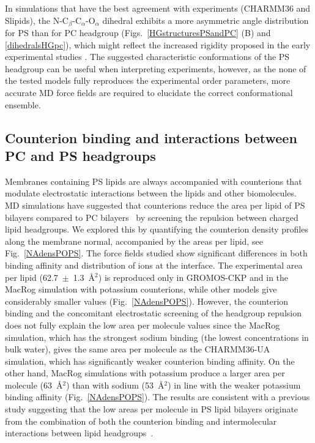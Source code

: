 \documentclass[journal=jpcbfk,manuscript=article]{achemso}
\begin{document}
In simulations that have the best agreement with experiments (CHARMM36 and Slipids),
the N-C$_\beta$-C$_\alpha$-O$_\alpha$ dihedral exhibits a more asymmetric
angle distribution for PS than for PC headgroup (Figs.~\ref{HGstructuresPSandPC} (B) and \ref{dihedralsHGpc}),
which might reflect the increased rigidity proposed in the early experimental studies \cite{browning80,buldt81}.
The suggested characteristic conformations of the PS headgroup can be useful when interpreting experiments,
however, as the none of the tested models fully reproduces the experimental order parameters, more accurate MD force fields are required to elucidate the correct conformational ensemble.

\subsection{Counterion binding and interactions between PC and PS headgroups}\label{ciBINDINGsection}

Membranes containing PS lipids are always accompanied with counterions that
modulate electrostatic interactions between the lipids and other biomolecules. MD simulations have suggested
that counterions reduce the area per lipid of PS bilayers compared to PC
bilayers~\cite{pandit02,mukhopadhyay04,pedersen06} by screening the repulsion between charged lipid headgroups.
We explored this by quantifying the counterion density profiles along the membrane normal, accompanied by the areas per lipid, see Fig.~\ref{NAdensPOPS}.
The force fields studied show significant differences in both binding affinity
and distribution of ions at the interface.
The experimental area per lipid (62.7~$\pm$~1.3~\AA$^2$) \cite{pan14} 
is reproduced only in GROMOS-CKP and in the MacRog simulation
with potassium counterions, while other models give considerably smaller values (Fig.~\ref{NAdensPOPS}).
However, the counterion binding and the concomitant electrostatic screening of the headgroup
repulsion does not fully explain the low area per molecule values
since the MacRog simulation, which has the strongest sodium binding
(the lowest concentrations in bulk water), gives the same area per molecule
as the CHARMM36-UA simulation, which has significantly weaker counterion binding
affinity. On the other hand, MacRog simulations with potassium produce a larger area per molecule (63~\AA$^2$) than
with sodium (53~\AA$^2$) in line with the weaker potassium binding affinity (Fig.~\ref{NAdensPOPS}).
The results are consistent with a previous study suggesting that the
low areas per molecule in PS lipid bilayers originate from the combination
of both the counterion binding and intermolecular interactions between lipid headgroups~\cite{petrache04}.
\end{document}
